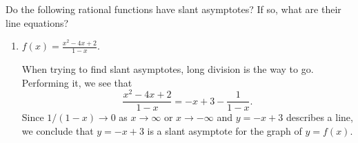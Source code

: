 \documentclass{ximera}
\begin{document}
\begin{example} Do the following rational functions have slant asymptotes? If so, what are their line equations?
  \begin{enumerate}
  \item $f(x) = \frac{x^2-4x+2}{1-x}$. \\[1em]
    \begin{explanation}
      When trying to find slant asymptotes, long division is the way to go. Performing it, we see that $$    \frac{x^2-4x+2}{1-x} = -x+3 - \frac{1}{1-x}.  $$Since $1/(1-x) \to 0$ as $x \to \infty$ or $x \to -\infty$ and $y=-x+3$ describes a line, we conclude that $y=-x+3$ is a slant asymptote for the graph of $y=f(x)$.
  \begin{image}
 \end{image}
    \end{explanation}
    

\end{enumerate}
\end{example}
\end{document}
